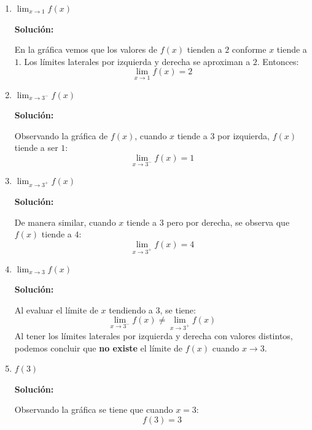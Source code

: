 \documentclass[12pt]{article}
\newcommand{\solucion}{%
    \vspace{0.8em}%
    \textbf{Solución:}%
}
\begin{document}
\begin{enumerate}[label=\roman*.]
    \item $\displaystyle\lim_{x \to 1} f(x)$

    \solucion

    En la gráfica vemos que los valores de $f(x)$ tienden a $2$ conforme $x$ tiende a $1$. Los límites laterales por izquierda y derecha se aproximan a $2$. Entonces:
    \[
        \lim_{x \to 1} f(x) = 2
    \]

    \item $\displaystyle\lim_{x \to 3^-} f(x)$

    \solucion

    Observando la gráfica de $f(x)$, cuando $x$ tiende a $3$ por izquierda, $f(x)$ tiende a ser $1$:
    \[
        \lim_{x \to 3^-} f(x) = 1
    \]

    \item $\displaystyle\lim_{x \to 3^+} f(x)$

    \solucion

    De manera similar, cuando $x$ tiende a $3$ pero por derecha, se observa que $f(x)$ tiende a $4$:
    \[
        \lim_{x \to 3^+} f(x) = 4
    \]

    \newpage
    \item $\displaystyle\lim_{x \to 3} f(x)$

    \solucion

    Al evaluar el límite de $x$ tendiendo a $3$, se tiene:
    \[
        \lim_{x \to 3^-} f(x) \neq \lim_{x \to 3^+} f(x)
    \]
    Al tener los límites laterales por izquierda y derecha con valores distintos, podemos concluir que \textbf{no existe} el límite de $f(x)$ cuando $x \to 3$.

    \item $f(3)$

    \solucion

    Observando la gráfica se tiene que cuando $x = 3$:
    \[
        f(3) = 3
    \]
\end{enumerate}
\end{document}
